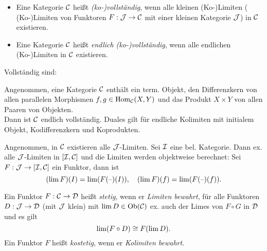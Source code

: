 \documentclass{cheat-sheet}
\begin{document}
\begin{defn}
  \begin{itemize}
    \item Eine Kategorie $\mathcal{C}$ heißt \emph{(ko-)vollständig}, wenn alle kleinen (Ko-)Limiten (\dh{} (Ko-)Limiten von Funktoren $F : \mathcal{J} \to \mathcal{C}$ mit einer kleinen Kategorie $\mathcal{J}$) in $\mathcal{C}$ existieren.
    \item Eine Kategorie $\mathcal{C}$ heißt \emph{endlich (ko-)vollständig}, wenn alle endlichen (Ko-)Limiten in $\mathcal{C}$ existieren.
  \end{itemize}
\end{defn}

\begin{bspe}
  Vollständig sind: \enspace
  \inlineitem{$\SetC$,}
  \inlineitem{$\Grp$,}
  \inlineitem{$\AbGrp$,}
  \inlineitem{$\Top$,}
\end{bspe}

\begin{satz}
  Angenommen, eine Kategorie $\mathcal{C}$ enthält ein term. Objekt, den Differenzkern von allen parallelen Morphismen $f, g \in \operatorname{Hom}_{\mathcal{C}}(X, Y)$ und das Produkt $X \times Y$ von allen Paaren von Objekten. \\
  Dann ist $\mathcal{C}$ endlich vollständig.
  Duales gilt für endliche Kolimiten mit initialem Objekt, Kodifferenzkern und Koprodukten.
\end{satz}

\iffalse
  \begin{kor}
    In $\SetC$ existieren alle endlichen Limiten und Kolimiten.
  \end{kor}
\fi

\begin{bem}
  Angenommen, in $\mathcal{C}$ existieren alle $\mathcal{J}$-Limiten.
  Sei $\mathcal{I}$ eine bel. Kategorie.
  Dann ex. alle $\mathcal{J}$-Limiten in $[\mathcal{I}, \mathcal{C}]$ und die Limiten werden objektweise berechnet:
  Sei $F : \mathcal{J} \to [\mathcal{I}, \mathcal{C}]$ ein Funktor, dann ist
  \[
    (\lim F)(I) = \lim (F(\text{--})(I)), \quad
    (\lim F)(f) = \lim (F(\text{--})(f)).
  \]
\end{bem}

\begin{defn}
  Ein Funktor $F : \mathcal{C} \to \mathcal{D}$ heißt \emph{stetig}, wenn er \emph{Limiten bewahrt}, \dh{} für alle Funktoren $D : \mathcal{J} \to \mathcal{D}$ (mit $\mathcal{J}$ klein) mit $\lim D \in \operatorname{Ob}(\mathcal{C})$ ex. auch der Limes von $F \circ G$ in $\mathcal{D}$ und es gilt
  \[ \lim (F \circ D) \cong F(\lim D). \]
  Ein Funktor $F$ heißt \emph{kostetig}, wenn er \emph{Kolimiten bewahrt}.
\end{defn}
\end{document}
